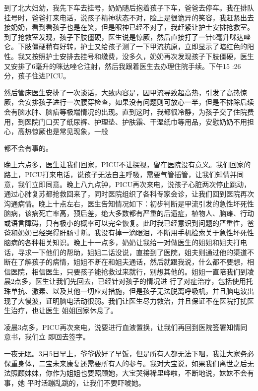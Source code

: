 \documentclass{article}
\begin{document}
\newpage

到了北大妇幼，我先下车去挂号，奶奶随后抱着孩子下车，爸爸去停车。我在排队挂号时，爸爸打来电话，说孩子精神状态不对，脸上是很诡异的笑容，我赶紧出去接奶奶，看到看孩子也是在笑，但是眼神已经不对了，我赶紧让护士安排抢救室。到了抢救室发现，孩子下肢僵硬，医生说是惊厥，然后直接打了一针6毫升咪达唑仑。下肢僵硬稍有好转，护士又给孩子测了一下甲流抗原，立即显示了暗红色的阳性。我又按照护士安排去挂号和缴费，没多久，奶奶再次发现孩子下肢僵硬，医生又安排了6毫升的咪达唑仑注射，然后我跟着医生去办理住院手续。下午15
:26分，孩子住进PICU。 

然后管床医生安排了一次谈话，大致内容是，因甲流导致超高热，引发了高热惊厥，会安排孩子进行一次腰穿检查，如果没有问题则可放心一半，但是不排除后续会有脑水肿、脑疝等极端情况的出现。直到这时，我都很冷静，为孩子交了住院费用，到医院门口买了纸尿裤、护理垫、护肤霜、干湿纸巾等用品，安慰奶奶不用担心，高热惊厥也是常见现象，一般

\newpage
都不会有事的。 

晚上六点多，医生让我们回家，PICU不让探视，留在医院没有意义。我们回家的路上，PICU打来电话，说孩子无法自主呼吸，需要气管插管，让我们知情并同意，我们立即同意。晚上八九点钟，PICU再次来电，说孩子心脏两次停止跳动，通过心肺复苏都抢救回来了，同时医院组织了各科专家会诊，让我们回到医院再次沟通病情。晚上十点左右，医生告知情况如下：初步判断是甲流引发的急性坏死性脑病，该病死亡率高，预后差，绝大多数都有严重的后遗症，植物人、脑瘫、行动或语言障碍，只有极小的概率可以完全恢复。此时我已经意识到问题的严重性，爸爸和奶奶已经哭得肝肠寸断。我没有掉一滴眼泪，不断用手机检索关于急性坏死性脑病的各种相关知识。晚上十一点多，奶奶让我给一对做医生的姐姐和姐夫打电话，寻求一下他们的帮助，姐姐二话没说，直接到了医院，姐夫则通过他的渠道不断在了解孩子的病情，姐姐不断在和姐夫通话，然后就跟我说，什么都不要想，相信医院，相信医生，只要孩子能抢救过来就行，别想其他的。姐姐一直陪我们到凌晨2点多，医生让我们先回去，已经针对孩子的情况进
\newpage
行了对症治疗，包括使用托珠单抗、激素、以及其他一切应对措施，但是孩子无法脱离呼吸机，并且脑电波出现了大慢波，证明脑电活动很弱。我们让医生尽力救治，并且保证不在医院打扰医生治疗，也让医生
姐姐回家休息了。 

凌晨3点多，PICU再次来电，说要进行血液置换，让我们再回到医院签署知情同意书，我们立
即回去签字。 

一夜无眠。3月5日早上，爷爷做好了早饭，但是所有人都无法下咽，我让大家务必保重身体，二宝未来康复还需要所有人的参与。我对大宝说，如果我们离世之后无法照顾妹妹，你作为姐姐也要照顾她，大宝哭得稀里哗啦，不断地说，妹妹不会有事，她
平时活蹦乱跳的，让我们不要吓唬她。 
\end{document}
